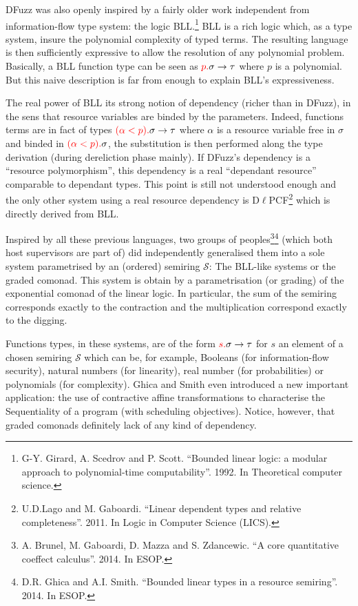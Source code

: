 \documentclass{article}[11pt]
\newcommand\sS{\mathcal S}
\begin{document}
DFuzz was also openly inspired by a fairly older work independent from information-flow type system: the logic BLL.\footnote{G-Y. Girard, A. Scedrov and P. Scott. ``Bounded linear logic: a modular approach to polynomial-time computability''. 1992. In Theoretical computer science.} BLL is a rich logic which, as a type system, insure the polynomial complexity of typed terms. The resulting language is then sufficiently expressive to allow the resolution of any polynomial problem. Basically, a BLL function type can be seen as  ${\color{red}p.}\sigma\rightarrow \tau$ where $p$ is a polynomial. But this naive description is far from enough to explain BLL's expressiveness.

The real power of BLL its strong notion of dependency (richer than in DFuzz), in the sens that resource variables are binded by the parameters. Indeed, functions terms are in fact of types ${\color{red}(\alpha<p).}\sigma\rightarrow \tau$ where $\alpha$ is a resource variable free in $\sigma$ and binded in ${\color{red}(\alpha<p).}\sigma$, the substitution is then performed along the type derivation (during dereliction phase mainly). If DFuzz's dependency is a ``resource polymorphism'', this dependency is a real ``dependant resource'' comparable to dependant types. This point is still not understood enough and the only other system using a real resource dependency is D$\ell$PCF\footnote{U.D.Lago and M. Gaboardi. ``Linear dependent types and relative completeness''. 2011. In Logic in Computer Science (LICS).} which is directly derived from BLL.

Inspired by all these previous languages, two groups of peoples\footnote{A. Brunel, M. Gaboardi, D. Mazza and S. Zdancewic. ``A core quantitative coeffect calculus''. 2014. In ESOP.}\footnote{D.R. Ghica and A.I. Smith. ``Bounded linear types in a resource semiring''. 2014. In ESOP.} (which both host supervisors are part of) did independently generalised them into a sole system parametrised by an (ordered) semiring $\sS$: The BLL-like systems or the graded comonad.  This system is obtain by a parametrisation (or grading) of the exponential comonad of the linear logic. In particular, the sum of the semiring corresponds exactly to the contraction and the multiplication correspond exactly to the digging. 

Functions types, in these systems, are of the form ${\color{red}s.}\sigma\rightarrow \tau$ for $s$ an element of a chosen semiring $\sS$ which can be, for example, Booleans (for information-flow security), natural numbers (for linearity), real number (for probabilities) or polynomials (for complexity). Ghica and Smith even introduced a new important application: the use of contractive affine transformations to characterise the Sequentiality of a program (with scheduling objectives). Notice, however, that graded comonads definitely lack of any kind of dependency.
\end{document}
